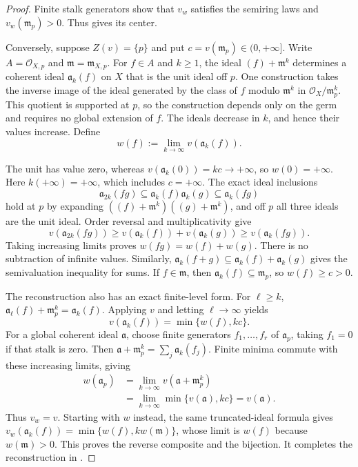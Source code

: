 \begin{proof}
Finite stalk generators show that $v_w$ satisfies the semiring
laws and $v_w(\mathfrak m_p)>0$.
Thus  gives its center.

Conversely, suppose $Z(v)=\{p\}$ and put
$c=v(\mathfrak m_p)\in(0,+\infty]$.
Write $A=\mathcal O_{X,p}$ and $\mathfrak m=\mathfrak m_{X,p}$.
For $f\in A$ and $k\geq1$, the ideal
$(f)+\mathfrak m^k$ determines a coherent ideal
$\mathfrak a_k(f)$ on $X$ that is the unit ideal off $p$.
One construction takes the inverse image of the ideal generated
by the class of $f$ modulo $\mathfrak m^k$ in
$\mathcal O_X/\mathfrak m_p^k$.
This quotient is supported at $p$, so the construction depends
only on the germ and requires no global extension of $f$.
The ideals decrease in $k$, and hence their values increase.
Define
\[
       w(f):=\lim_{k\to\infty}v(\mathfrak a_k(f)).
\tag{58.19a}\label{eq:ts-local-recovery}
\]

The unit has value zero, whereas
$v(\mathfrak a_k(0))=kc\to+\infty$, so $w(0)=+\infty$.
Here $k(+\infty)=+\infty$, which includes $c=+\infty$.
The exact ideal inclusions
\[
 \mathfrak a_{2k}(fg)
   \subseteq\mathfrak a_k(f)\mathfrak a_k(g)
   \subseteq\mathfrak a_k(fg)
\]
hold at $p$ by expanding
$((f)+\mathfrak m^k)((g)+\mathfrak m^k)$, and off $p$
all three ideals are the unit ideal.
Order reversal and multiplicativity give
\[
 v(\mathfrak a_{2k}(fg))
  \geq v(\mathfrak a_k(f))+v(\mathfrak a_k(g))
  \geq v(\mathfrak a_k(fg)).
\]
Taking increasing limits proves $w(fg)=w(f)+w(g)$.
There is no subtraction of infinite values.
Similarly,
$\mathfrak a_k(f+g)\subseteq\mathfrak a_k(f)+\mathfrak a_k(g)$
gives the semivaluation inequality for sums.
If $f\in\mathfrak m$, then
$\mathfrak a_k(f)\subseteq\mathfrak m_p$, so $w(f)\geq c>0$.

The reconstruction also has an exact finite-level form.
For $\ell\geq k$,
$\mathfrak a_\ell(f)+\mathfrak m_p^k=\mathfrak a_k(f)$.
Applying $v$ and letting $\ell\to\infty$ yields
\[
              v(\mathfrak a_k(f))=\min\{w(f),kc\}.
\tag{58.19b}\label{eq:ts-local-finite-truncation}
\]
For a global coherent ideal $\mathfrak a$, choose finite
generators $f_1,\ldots,f_r$ of $\mathfrak a_p$, taking $f_1=0$
if that stalk is zero. Then $\mathfrak a+\mathfrak m_p^k=\sum_j\mathfrak a_k(f_j)$.
Finite minima commute with these increasing limits, giving
\[
 \begin{split}
 w(\mathfrak a_p)
 &=\lim_{k\to\infty}v(\mathfrak a+\mathfrak m_p^k)\\
 &=\lim_{k\to\infty}\min\{v(\mathfrak a),kc\}
   =v(\mathfrak a).
 \end{split}
\]
Thus $v_w=v$.
Starting with $w$ instead, the same truncated-ideal formula gives
$v_w(\mathfrak a_k(f))=\min\{w(f),kw(\mathfrak m)\}$,
whose limit is $w(f)$ because $w(\mathfrak m)>0$.
This proves the reverse composite and the bijection.
It completes the reconstruction in
\cite[Example~2.1.4, p.~12]{MPTropicalV2}.
\end{proof}

